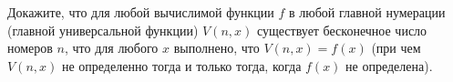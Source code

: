 Докажите, что для любой вычислимой функции $f$ в любой главной нумерации (главной универсальной функции) $V(n, x)$ существует
бесконечное число номеров $n$, что для любого $x$ выполнено, что $V(n, x) = f(x)$ (при чем $V(n, x)$ не определенно тогда и
только тогда, когда $f(x)$ не определена).